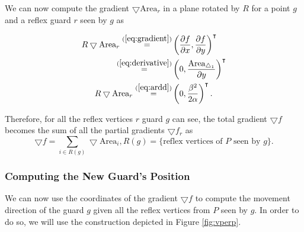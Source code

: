 

We can now compute the gradient $\bigtriangledown \text{Area}_r$ in a plane rotated by $R$ for a point $g$ and a reflex guard $r$ seen by $g$ as

\begin{align*}
    R\bigtriangledown \text{Area}_r \overset{(\ref{eq:gradient})}{=} &\left(\frac{\partial f}{\partial x}, \frac{\partial f}{\partial y}\right)^\intercal \\
    \overset{(\ref{eq:derivative})}{=} &\left(0, \frac{\text{Area}_{\triangle_1}}{\partial y}\right)^\intercal \\
    R\bigtriangledown \text{Area}_r \overset{(\ref{eq:ardd})}{=} &\left(0, \frac{\beta^2}{2\alpha}\right)^\intercal.
\end{align*}


Therefore, for all the reflex vertices $r$ guard $g$ can see, the total gradient $\bigtriangledown f$ becomes the sum of all the partial gradients $\bigtriangledown f_r$ as $$\bigtriangledown f = \sum_{i \in R(g)} \bigtriangledown \text{Area}_i, R(g) = \{\text{reflex vertices of } P \text{ seen by }g\}.$$

\subsubsection{Computing the New Guard's Position}
We can now use the coordinates of the gradient $\bigtriangledown f$ to compute the movement direction of the guard $g$ given all the reflex vertices from $P$ seen by $g$. In order to do so, we will use the construction depicted in Figure \ref{fig:vperp}. 

